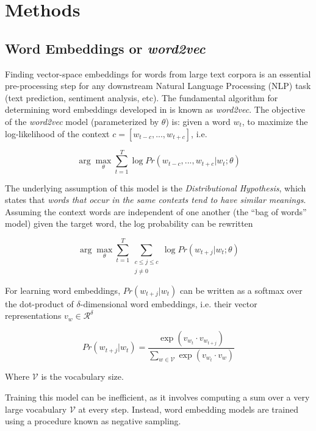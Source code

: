 \section{Methods}

\subsection{Word Embeddings or \textit{word2vec}}

Finding vector-space embeddings for words from large text corpora is an essential pre-processing step for any downstream Natural Language Processing (NLP) task (text prediction, sentiment analysis, etc). The fundamental algorithm for determining word embeddings developed in \citet{Mikolov} is known as \textit{word2vec}. The objective of the \textit{word2vec} model (parameterized by $\theta$) is: given a word $w_t$, to maximize the log-likelihood of the context $c = [w_{t-c}, ... , w_{t+c}]$, i.e.

\begin{equation*}
\arg\max_\theta \sum_{t=1}^T \log Pr(w_{t-c}, ... , w_{t+c} | w_t ; \theta)
\end{equation*}

The underlying assumption of this model is the \textit{Distributional Hypothesis}, which states that \textit{words that occur in the same contexts tend to have similar meanings}. Assuming the context words are independent of one another (the ``bag of words'' model) given the target word, the log probability can be rewritten

\begin{equation*}
\arg\max_\theta \sum_{t=1}^T \sum_{\substack{c \le j \le c \\ j \ne 0}} \log Pr(w_{t+j} | w_t ; \theta)
\end{equation*}

For learning word embeddings, $Pr(w_{t+j} | w_t)$ can be written as a softmax over the dot-product of $\delta$-dimensional word embeddings, i.e. their vector representations $v_w \in \mathcal{R^\delta}$

\begin{equation*}
Pr(w_{t+j} | w_t) = \dfrac{\exp(v_{w_t} \cdot v_{w_{t+j}})}{\sum_{w\in\mathcal{V}} \exp(v_{w_t} \cdot v_{w})}
\end{equation*}

Where $\mathcal{V}$ is the vocabulary size.

Training this model can be inefficient, as it involves computing a sum over a very large vocabulary $\mathcal{V}$ at every step. Instead, word embedding models are trained using a procedure known as negative sampling.

